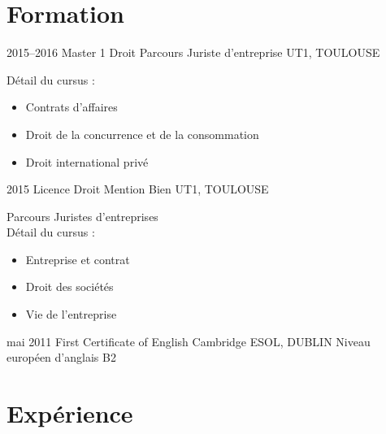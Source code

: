 \documentclass[]{friggeri-cv} %
\begin{document}

\section{Formation}

\begin{entrylist}
\entry
{2015--2016}
{Master 1 Droit {\normalfont Parcours Juriste d'entreprise}}
{UT1, TOULOUSE}
{Détail du cursus :
\begin{itemize}
\item Contrats d'affaires
\item Droit de la concurrence et de la consommation
\item Droit international privé
\end{itemize}}
\entry
{2015}
{Licence Droit {\normalfont Mention Bien}}
{UT1, TOULOUSE}
{Parcours Juristes d'entreprises\\
Détail du cursus :
\begin{itemize}
\item Entreprise et contrat
\item Droit des sociétés
\item Vie de l'entreprise
\end{itemize}}
\entry
{mai 2011}
{First Certificate of English}
{Cambridge ESOL, DUBLIN}
{Niveau européen d'anglais B2}

\end{entrylist}


\section{Expérience}
\end{document}
